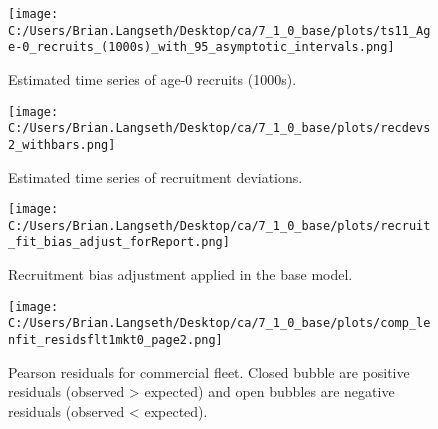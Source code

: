 \documentclass[11pt,
  english,
  a4paper,
]{article}
\begin{document}
\begin{figure}
\centering
\texttt{[image: C:/Users/Brian.Langseth/Desktop/ca/7\_1\_0\_base/plots/ts11\_Age-0\_recruits\_(1000s)\_with\_95\_asymptotic\_intervals.png]}
\caption{Estimated time series of age-0 recruits (1000s).\label{fig:recruits}}
\end{figure}

\tagmcend\tagstructend


\begin{figure}
\centering
\texttt{[image: C:/Users/Brian.Langseth/Desktop/ca/7\_1\_0\_base/plots/recdevs2\_withbars.png]}
\caption{Estimated time series of recruitment deviations.\label{fig:rec-devs}}
\end{figure}

\tagmcend\tagstructend


\begin{figure}
\centering
\texttt{[image: C:/Users/Brian.Langseth/Desktop/ca/7\_1\_0\_base/plots/recruit\_fit\_bias\_adjust\_forReport.png]}
\caption{Recruitment bias adjustment applied in the base model.\label{fig:bias-adj}}
\end{figure}

\tagmcend\tagstructend


\begin{figure}
\centering
\texttt{[image: C:/Users/Brian.Langseth/Desktop/ca/7\_1\_0\_base/plots/comp\_lenfit\_residsflt1mkt0\_page2.png]}
\caption{Pearson residuals for commercial fleet. Closed bubble are positive residuals (observed \textgreater{} expected) and open bubbles are negative residuals (observed \textless{} expected).\label{fig:com-pearson}}
\end{figure}

\tagmcend\tagstructend

\end{document}
